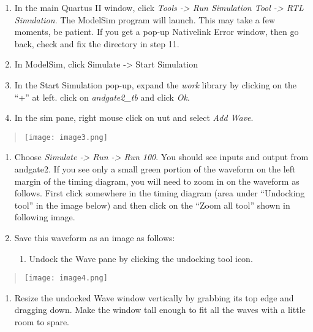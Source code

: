 \begin{enumerate}
\def\labelenumi{\arabic{enumi}.}
\setcounter{enumi}{17}
\item
  In the main Quartus II window, click \emph{Tools -\textgreater{} Run
  Simulation Tool -\textgreater{} RTL Simulation}. The ModelSim program
  will launch. This may take a few moments, be patient. If you get a
  pop-up Nativelink Error window, then go back, check and fix the
  directory in step 11.
\item
  In ModelSim, click Simulate -\textgreater{} Start Simulation
\item
  In the Start Simulation pop-up, expand the \emph{work} library by
  clicking on the ``+'' at left. click on \emph{andgate2\_tb} and click
  \emph{Ok}.
\item
  In the sim pane, right mouse click on uut and select \emph{Add Wave}.
\end{enumerate}

\begin{quote}
\texttt{[image: image3.png]}
\end{quote}

\begin{enumerate}
\def\labelenumi{\arabic{enumi}.}
\setcounter{enumi}{21}
\item
  Choose \emph{Simulate -\textgreater{} Run -\textgreater{} Run 100}.
  You should see inputs and output from andgate2. If you see only a
  small green portion of the waveform on the left margin of the timing
  diagram, you will need to zoom in on the waveform as follows. First
  click somewhere in the timing diagram (area under ``Undocking tool''
  in the image below) and then click on the ``Zoom all tool'' shown in
  following image.
\item
  \protect\hypertarget{Part_1_Step_23}{}{}Save this waveform as an image
  as follows:

  \begin{enumerate}
  \def\labelenumii{\alph{enumii}.}
  \item
    Undock the Wave pane by clicking the undocking tool icon.
  \end{enumerate}
\end{enumerate}

\begin{quote}
\texttt{[image: image4.png]}
\end{quote}

\begin{enumerate}
\def\labelenumi{\alph{enumi}.}
\setcounter{enumi}{1}
\item
  Resize the undocked Wave window vertically by grabbing its top edge
  and dragging down. Make the window tall enough to fit all the waves
  with a little room to spare.
\end{enumerate}

